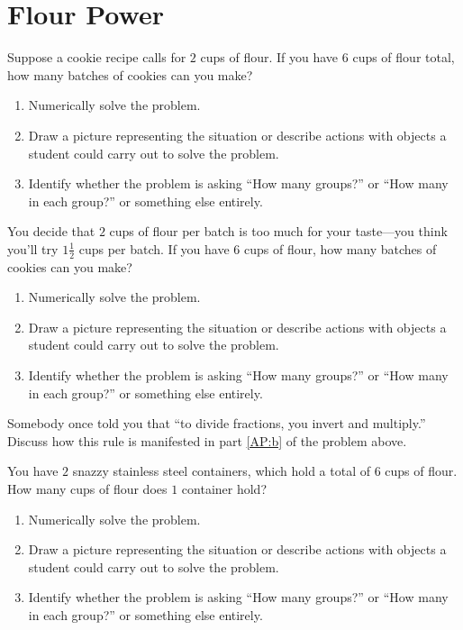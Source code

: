 \newpage
\section{Flour Power}\label{A:FlourPower}


\begin{prob} 
Suppose a cookie recipe calls for $2$ cups of flour. If you have $6$
cups of flour total, how many batches of cookies can you make?
\begin{enumerate}
\item Numerically solve the problem.
\item Draw a picture representing the situation or describe actions with objects a student could carry out to solve the problem.
\item Identify whether the problem is asking ``How many groups?'' or ``How many in each group?'' or something else entirely.
\end{enumerate}
\end{prob}


\begin{prob} 
You decide that $2$ cups of flour per batch is too much for your
taste---you think you'll try $1\frac{1}{2}$ cups per batch. If you
have $6$ cups of flour, how many batches of cookies can you make?
\begin{enumerate}
\item Numerically solve the problem.
\item\label{AP:b} Draw a picture representing the situation or
  describe actions with objects a student could carry out to solve the
  problem.
\item Identify whether the problem is asking ``How many groups?'' or ``How many in each group?'' or something else entirely.
\end{enumerate}
\end{prob}

\begin{prob}
Somebody once told you that ``to divide fractions, you invert and
multiply.'' Discuss how this rule is manifested in part \ref{AP:b} of
the problem above.
\end{prob}



\begin{prob} 
You have $2$ snazzy stainless steel containers, which hold a total of
$6$ cups of flour. How many cups of flour does $1$ container hold?
\begin{enumerate}
\item Numerically solve the problem.
\item Draw a picture representing the situation or describe actions with objects a student could carry out to solve the problem.
\item Identify whether the problem is asking ``How many groups?'' or ``How many in each group?'' or something else entirely.
\end{enumerate}
\end{prob}


